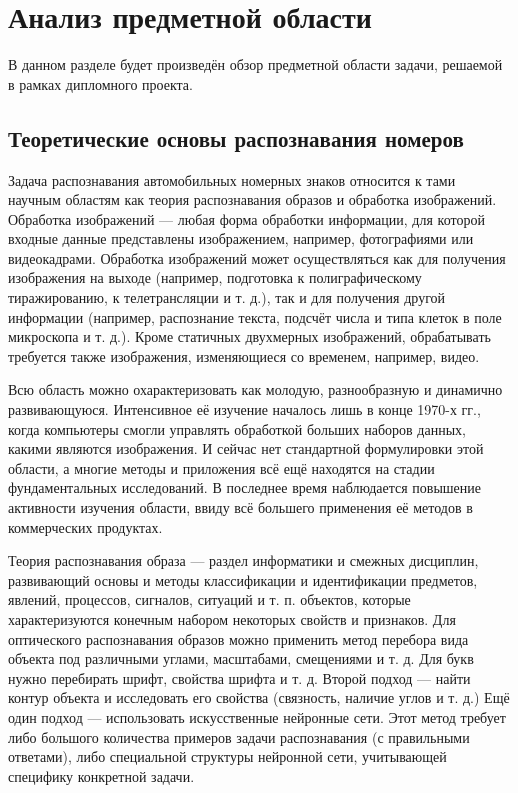 \section{Анализ предметной области}
\label{sec:domain}

В данном разделе будет произведён обзор предметной области задачи, решаемой в рамках дипломного проекта.

\subsection{Теоретические основы распознавания номеров}
\label{sub:domain:theory_basics}
Задача распознавания автомобильных номерных знаков относится к тами научным областям как теория распознавания образов и обработка изображений.
Обработка изображений — любая форма обработки информации, для которой входные данные представлены изображением, например, фотографиями или видеокадрами. Обработка изображений может осуществляться как для получения изображения на выходе (например, подготовка к полиграфическому тиражированию, к телетрансляции и т. д.), так и для получения другой информации (например, распознание текста, подсчёт числа и типа клеток в поле микроскопа и т. д.). Кроме статичных двухмерных изображений, обрабатывать требуется также изображения, изменяющиеся со временем, например, видео.~\cite{image_precessing}

Всю область можно охарактеризовать как молодую, разнообразную и динамично развивающуюся. Интенсивное её изучение началось лишь в конце 1970-х гг., когда компьютеры смогли управлять обработкой больших наборов данных, какими являются изображения. И сейчас нет стандартной формулировки этой области, а многие методы и приложения всё ещё находятся на стадии фундаментальных исследований. В последнее время наблюдается повышение активности изучения области, ввиду всё большего применения её методов в коммерческих продуктах.

Теория распознавания образа — раздел информатики и смежных дисциплин, развивающий основы и методы классификации и идентификации предметов, явлений, процессов, сигналов, ситуаций и т. п. объектов, которые характеризуются конечным набором некоторых свойств и признаков.
Для оптического распознавания образов можно применить метод перебора вида объекта под различными углами, масштабами, смещениями и т. д. Для букв нужно перебирать шрифт, свойства шрифта и т. д.
Второй подход — найти контур объекта и исследовать его свойства (связность, наличие углов и т. д.)
Ещё один подход — использовать искусственные нейронные сети. Этот метод требует либо большого количества примеров задачи распознавания (с правильными ответами), либо специальной структуры нейронной сети, учитывающей специфику конкретной задачи.


